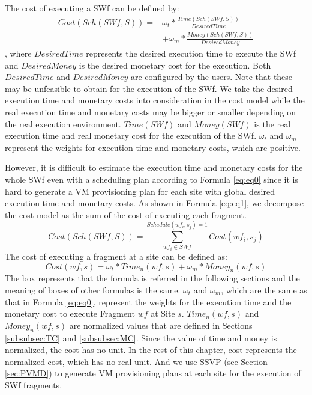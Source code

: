 The cost of executing a SWf can be defined by:
\begin{equation}\label{eq:eq0}
\begin{split}
Cost ( Sch(SWf, S) ) = &\omega_t * \frac{Time( Sch(SWf, S) )}{DesiredTime} \\&+ \omega_m * \frac{Money( Sch(SWf, S) )}{DesiredMoney}
\end{split}
\end{equation}
, where $DesiredTime$ represents the desired execution time to execute the SWf and $DesiredMoney$ is the desired monetary cost for the execution. Both $DesiredTime$ and $DesiredMoney$ are configured by the users. Note that these may be unfeasible to obtain for the execution of the SWf. We take the desired execution time and monetary costs into consideration in the cost model while the real execution time and monetary costs may be bigger or smaller depending on the real execution environment. $Time(SWf)$ and $Money(SWf)$ is the real execution time and real monetary cost for the execution of the SWf. $\omega_t$ and $\omega_m$ represent the weights for execution time and monetary costs, which are positive. 

However, it is difficult to estimate the execution time and monetary costs for the whole SWf even with a scheduling plan according to Formula \ref{eq:eq0} since it is hard to generate a VM provisioning plan for each site with global desired execution time and monetary costs. As shown in Formula \ref{eq:eq1}, we decompose the cost model as the sum of the cost of executing each fragment. 
\begin{equation}\label{eq:eq1}
Cost ( Sch( SWf, S ) ) = \sum^{Schedule(wf_i, s_j) = 1}_{ wf_i \in SWf } Cost( wf_i, s_j ) 
\end{equation}
The cost of executing a fragment at a site can be defined as:
\begin{equation}\label{eq:eq2}
\boxed{
Cost ( wf, s ) = \omega_t * Time_n( wf, s ) + \omega_m * Money_n( wf, s ) 
}
\end{equation}
The box represents that the formula is referred in the following sections and the meaning of boxes of other formulas is the same.
$\omega_t$ and $\omega_m$, which are the same as that in Formula \ref{eq:eq0}, represent the weights for the execution time and the monetary cost to execute Fragment $wf$ at Site $s$. $Time_n( wf, s )$ and $Money_n( wf, s )$ are normalized values that are defined in Sections \ref{subsubsec:TC} and \ref{subsubsec:MC}. Since the value of time and money is normalized, the cost has no unit. In the rest of this chapter, cost represents the normalized cost, which has no real unit. And we use SSVP (see Section \ref{sec:PVMD}) to generate VM provisioning plans at each site for the execution of SWf fragments.

